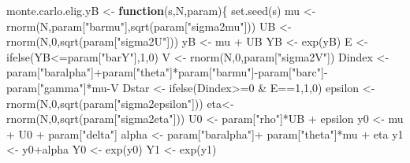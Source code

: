 \documentclass[
]{book}
\newenvironment{Shaded}{\begin{snugshade}}{\end{snugshade}}
\newcommand{\ControlFlowTok}[1]{\textcolor[rgb]{0.13,0.29,0.53}{\textbf{#1}}}
\newcommand{\DecValTok}[1]{\textcolor[rgb]{0.00,0.00,0.81}{#1}}
\newcommand{\FunctionTok}[1]{\textcolor[rgb]{0.00,0.00,0.00}{#1}}
\newcommand{\NormalTok}[1]{#1}
\newcommand{\OtherTok}[1]{\textcolor[rgb]{0.56,0.35,0.01}{#1}}
\newcommand{\SpecialCharTok}[1]{\textcolor[rgb]{0.00,0.00,0.00}{#1}}
\newcommand{\StringTok}[1]{\textcolor[rgb]{0.31,0.60,0.02}{#1}}
\theoremstyle{definition}
\theoremstyle{definition}
\theoremstyle{definition}
\theoremstyle{definition}
\theoremstyle{remark}
\begin{document}
\begin{Shaded}
\begin{Highlighting}[]
\NormalTok{monte.carlo.elig.yB }\OtherTok{\textless{}{-}} \ControlFlowTok{function}\NormalTok{(s,N,param)\{}
  \FunctionTok{set.seed}\NormalTok{(s)}
\NormalTok{  mu }\OtherTok{\textless{}{-}} \FunctionTok{rnorm}\NormalTok{(N,param[}\StringTok{"barmu"}\NormalTok{],}\FunctionTok{sqrt}\NormalTok{(param[}\StringTok{"sigma2mu"}\NormalTok{]))}
\NormalTok{  UB }\OtherTok{\textless{}{-}} \FunctionTok{rnorm}\NormalTok{(N,}\DecValTok{0}\NormalTok{,}\FunctionTok{sqrt}\NormalTok{(param[}\StringTok{"sigma2U"}\NormalTok{]))}
\NormalTok{  yB }\OtherTok{\textless{}{-}}\NormalTok{ mu }\SpecialCharTok{+}\NormalTok{ UB }
\NormalTok{  YB }\OtherTok{\textless{}{-}} \FunctionTok{exp}\NormalTok{(yB)}
\NormalTok{  E }\OtherTok{\textless{}{-}} \FunctionTok{ifelse}\NormalTok{(YB}\SpecialCharTok{\textless{}=}\NormalTok{param[}\StringTok{"barY"}\NormalTok{],}\DecValTok{1}\NormalTok{,}\DecValTok{0}\NormalTok{)}
\NormalTok{  V }\OtherTok{\textless{}{-}} \FunctionTok{rnorm}\NormalTok{(N,}\DecValTok{0}\NormalTok{,param[}\StringTok{"sigma2V"}\NormalTok{])}
\NormalTok{  Dindex }\OtherTok{\textless{}{-}}\NormalTok{ param[}\StringTok{"baralpha"}\NormalTok{]}\SpecialCharTok{+}\NormalTok{param[}\StringTok{"theta"}\NormalTok{]}\SpecialCharTok{*}\NormalTok{param[}\StringTok{"barmu"}\NormalTok{]}\SpecialCharTok{{-}}\NormalTok{param[}\StringTok{"barc"}\NormalTok{]}\SpecialCharTok{{-}}\NormalTok{param[}\StringTok{"gamma"}\NormalTok{]}\SpecialCharTok{*}\NormalTok{mu}\SpecialCharTok{{-}}\NormalTok{V}
\NormalTok{  Dstar }\OtherTok{\textless{}{-}} \FunctionTok{ifelse}\NormalTok{(Dindex}\SpecialCharTok{\textgreater{}=}\DecValTok{0} \SpecialCharTok{\&}\NormalTok{ E}\SpecialCharTok{==}\DecValTok{1}\NormalTok{,}\DecValTok{1}\NormalTok{,}\DecValTok{0}\NormalTok{)}
\NormalTok{  epsilon }\OtherTok{\textless{}{-}} \FunctionTok{rnorm}\NormalTok{(N,}\DecValTok{0}\NormalTok{,}\FunctionTok{sqrt}\NormalTok{(param[}\StringTok{"sigma2epsilon"}\NormalTok{]))}
\NormalTok{  eta}\OtherTok{\textless{}{-}} \FunctionTok{rnorm}\NormalTok{(N,}\DecValTok{0}\NormalTok{,}\FunctionTok{sqrt}\NormalTok{(param[}\StringTok{"sigma2eta"}\NormalTok{]))}
\NormalTok{  U0 }\OtherTok{\textless{}{-}}\NormalTok{ param[}\StringTok{"rho"}\NormalTok{]}\SpecialCharTok{*}\NormalTok{UB }\SpecialCharTok{+}\NormalTok{ epsilon}
\NormalTok{  y0 }\OtherTok{\textless{}{-}}\NormalTok{ mu }\SpecialCharTok{+}\NormalTok{  U0 }\SpecialCharTok{+}\NormalTok{ param[}\StringTok{"delta"}\NormalTok{]}
\NormalTok{  alpha }\OtherTok{\textless{}{-}}\NormalTok{ param[}\StringTok{"baralpha"}\NormalTok{]}\SpecialCharTok{+}\NormalTok{  param[}\StringTok{"theta"}\NormalTok{]}\SpecialCharTok{*}\NormalTok{mu }\SpecialCharTok{+}\NormalTok{ eta}
\NormalTok{  y1 }\OtherTok{\textless{}{-}}\NormalTok{ y0}\SpecialCharTok{+}\NormalTok{alpha}
\NormalTok{  Y0 }\OtherTok{\textless{}{-}} \FunctionTok{exp}\NormalTok{(y0)}
\NormalTok{  Y1 }\OtherTok{\textless{}{-}} \FunctionTok{exp}\NormalTok{(y1)}
  

\end{Highlighting}
\end{Shaded}
\end{document}
